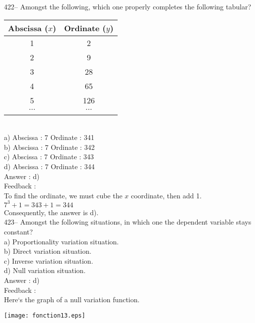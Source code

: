 \documentclass[letterpaper, 12pt]{article}
\begin{document}
422-- Amongst the following, which one properly completes the following tabular?\\
\begin{tabular}{|c|c|} \hline

{\bf Abscissa ($x$)} & {\bf Ordinate ($y$)}  \\ \hline \hline
1 & 2 \\ \hline
2 & 9 \\ \hline
3 & 28 \\ \hline
4 & 65 \\ \hline
5 & 126 \\ \hline
$\ldots$ & $\ldots$ \\ \hline
\multicolumn{2}{c}{}\\
\end{tabular}\\
a) Abscissa : 7 \qquad Ordinate : 341\\
b) Abscissa : 7 \qquad Ordinate : 342\\
c) Abscissa : 7 \qquad Ordinate : 343\\
d) Abscissa : 7 \qquad Ordinate : 344\\

Answer :  d)\\

Feedback : \\
To find the ordinate, we must cube the $x$ coordinate,
then add 1.\\
$7^{3}+1=343+1=344$\\
Consequently, the answer is d).\\

423-- Amongst the following situations, in which one the dependent variable stays constant?\\
a) Proportionality variation situation.\\
b) Direct variation situation.\\
c) Inverse variation situation.\\
d) Null variation situation.\\

Answer :  d)\\

Feedback : \\
Here`s the graph of a null variation function.\\
    \begin{center}
    \texttt{[image: fonction13.eps]}
    \end{center}
\end{document}
